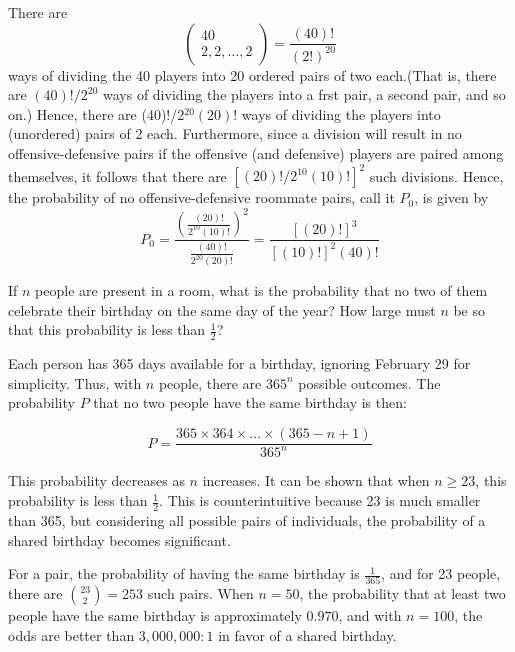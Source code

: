                 \begin{solution}
                There are
                $$\left(\begin{array}{cc}40\\2,2,\ldots,2\end{array}\right)=\frac{(40)!}{(2!)^{20}}$$
                ways of dividing the 40 players into 20 ordered pairs of two each.(That is, there are $(40)!/2^{20}$ ways of dividing the players into a frst pair, a second pair, and so on.) Hence, there are (40)!/2$^{20}(20)!$ ways of dividing the players into (unordered) pairs of 2 each. Furthermore, since a division will result in no offensive-defensive pairs if the offensive (and defensive) players are paired among themselves, it follows that there are $[(20)!/2^{10}(10)!]^{2}$ such divisions. Hence, the probability of no offensive-defensive roommate pairs, call it $P_0$, is given by
                $$P_0=\frac{\left(\frac{(20)!}{2^{10}(10)!}\right)^2}{\frac{(40)!}{2^{20}(20)!}}=\frac{[(20)!]^3}{[(10)!]^2(40)!}$$
                \end{solution}
                \begin{example}
                    If \(n\) people are present in a room, what is the probability that no two of them celebrate their birthday on the same day of the year? How large must \(n\) be so that this probability is less than \(\frac{1}{2}\)?
                \end{example}
                    
                    \begin{solution}
                    Each person has 365 days available for a birthday, ignoring February 29 for simplicity. Thus, with \(n\) people, there are \(365^n\) possible outcomes. The probability \(P\) that no two people have the same birthday is then:
                    
                    \[
                    P = \frac{365 \times 364 \times \ldots \times (365 - n + 1)}{365^n}
                    \]
                    
                    This probability decreases as \(n\) increases. It can be shown that when \(n \geq 23\), this probability is less than \(\frac{1}{2}\). This is counterintuitive because 23 is much smaller than 365, but considering all possible pairs of individuals, the probability of a shared birthday becomes significant.
                    
                    For a pair, the probability of having the same birthday is \(\frac{1}{365}\), and for 23 people, there are \(\binom{23}{2} = 253\) such pairs. When \(n=50\), the probability that at least two people have the same birthday is approximately \(0.970\), and with \(n=100\), the odds are better than \(3,000,000:1\) in favor of a shared birthday.
                    \end{solution}
            
